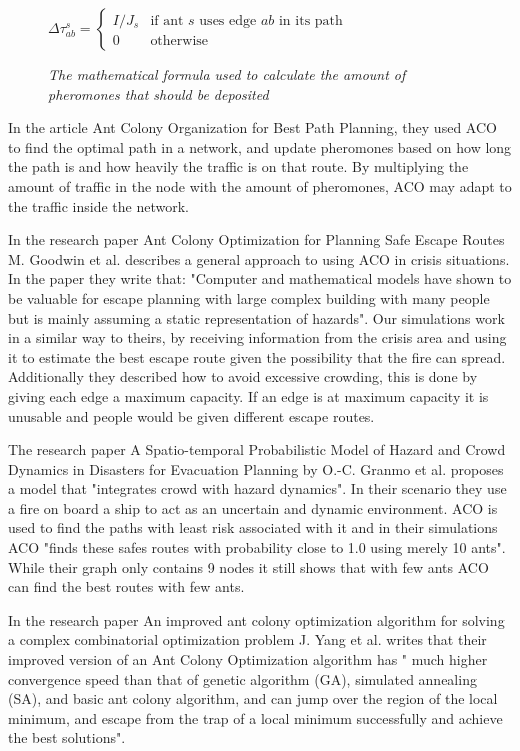 \begin{figure}[h]
\centering
\begin{math}
\Delta \tau^{s}_{ab} =
\begin{cases}
I/J_s & \mbox{if ant }s\mbox{ uses edge }ab\mbox{ in its path} \\
0 & \mbox{otherwise}
\end{cases}
\end{math}
\caption{\textit{The mathematical formula used to calculate the amount of pheromones that should be deposited}}
\label{fig:update}
\end{figure}


In the article Ant Colony Organization for Best Path Planning\cite{acobpp:2004}, they used ACO to find the optimal path in a network, and update pheromones based on how long the path is and how heavily the traffic is on that route. By multiplying the amount of traffic in the node with the amount of pheromones, ACO may adapt to the traffic inside the network.

In the research paper Ant Colony Optimization for Planning Safe Escape Routes \cite{acofpser} M. Goodwin et al. describes a general approach to using ACO in crisis situations. In the paper they write that: "Computer and mathematical models have shown to be valuable for escape planning with large complex building with many people but is mainly assuming a static representation of hazards". Our simulations work in a similar way to theirs, by receiving information from the crisis area and using it to estimate the best escape route given the possibility that the fire can spread. Additionally they described how to avoid excessive crowding, this is done by giving each edge a maximum capacity. If an edge is at maximum capacity it is unusable and people would be given different escape routes.

The research paper A Spatio-temporal Probabilistic Model of Hazard and Crowd Dynamics in Disasters for Evacuation Planning \cite{dbn} by O.-C. Granmo et al. proposes a model that "integrates crowd with hazard dynamics". In their scenario they use a fire on board a ship to act as an uncertain and dynamic environment.  ACO is used to find the paths with least risk associated with it and in their simulations ACO "finds these safes routes with probability close to 1.0 using merely 10 ants". While their graph only contains 9 nodes it still shows that with few ants ACO can find the best routes with few ants.  

In the research paper An improved ant colony optimization algorithm for solving a complex combinatorial optimization problem \cite{Yang2010653} J. Yang et al. writes that their improved version of an Ant Colony Optimization algorithm has " much higher convergence speed than that of genetic algorithm (GA), simulated annealing (SA), and basic ant colony algorithm, and can jump over the region of the local minimum, and escape from the trap of a local minimum successfully and achieve the best solutions".

